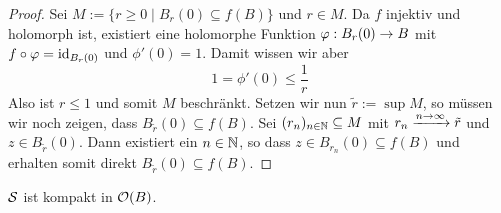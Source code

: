 \begin{proof}
  Sei $M:= \{ r\geq 0\mid B_r(0) \subseteq f(B) \}$ und $r \in M$. Da $f$ injektiv und
  holomorph ist, existiert eine holomorphe Funktion $\phi: B_r(0) \ra
  B$ mit $f \circ \phi = \id_{B_r(0)}$ und $\phi'(0) = 1$. Damit wissen
  wir aber
  \[
  1 = \phi'(0) \leq \frac{1}{r}
  \]
  Also ist $r \leq 1$ und somit $M$ beschränkt. Setzen wir nun $\tilde
  r := \sup M$, so müssen wir noch zeigen, dass $B_{\tilde r}(0) \subseteq
  f(B)$.
  Sei $(r_n)_{n \in \N}\subseteq M$ mit $r_n \xrightarrow{n \ra
    \infty} \tilde r$ und $z \in B_{\tilde r}(0)$. Dann existiert ein $n \in \N$,
  so dass $z \in B_{r_n}(0)\subseteq f(B)$ und erhalten somit direkt
  $B_{\tilde r}(0) \subseteq f(B)$.
\end{proof}

\begin{thm}
  \label{thm:schlicht-kompakt}
  $\S$ ist kompakt in $\hol(B)$.
\end{thm}

